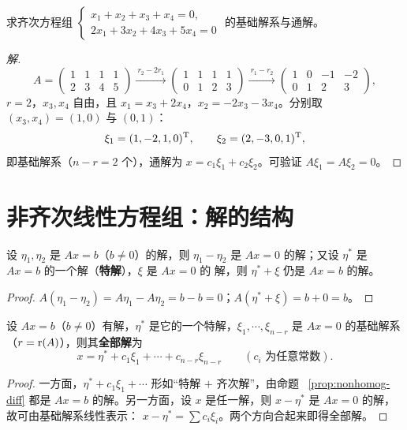 \begin{example}\label{ex:fundamental}
求齐次方程组 $\begin{cases} x_1+x_2+x_3+x_4=0, \\ 2x_1+3x_2+4x_3+5x_4=0 \end{cases}$
的基础解系与通解。
\end{example}
\begin{proof}[解]
\[
  A=\begin{pmatrix} 1 & 1 & 1 & 1 \\ 2 & 3 & 4 & 5 \end{pmatrix}
  \xrightarrow{\ r_2-2r_1\ }
  \begin{pmatrix} 1 & 1 & 1 & 1 \\ 0 & 1 & 2 & 3 \end{pmatrix}
  \xrightarrow{\ r_1-r_2\ }
  \begin{pmatrix} 1 & 0 & -1 & -2 \\ 0 & 1 & 2 & 3 \end{pmatrix},
\]
$r=2$，$x_3,x_4$ 自由，且 $x_1=x_3+2x_4$，$x_2=-2x_3-3x_4$。分别取
$(x_3,x_4)=(1,0)$ 与 $(0,1)$：
\[
  \xi_1=(1,-2,1,0)^{\mathrm{T}},\qquad \xi_2=(2,-3,0,1)^{\mathrm{T}},
\]
即基础解系（$n-r=2$ 个），通解为 $x=c_1\xi_1+c_2\xi_2$。可验证
$A\xi_1=A\xi_2=0$。
\end{proof}

\section{非齐次线性方程组：解的结构}\label{sec:nonhomogeneous}

\begin{proposition}\label{prop:nonhomog-diff}
设 $\eta_1,\eta_2$ 是 $Ax=b$（$b\neq0$）的解，则 $\eta_1-\eta_2$ 是 $Ax=0$
的解；又设 $\eta^*$ 是 $Ax=b$ 的一个解（\textbf{特解}），$\xi$ 是 $Ax=0$ 的
解，则 $\eta^*+\xi$ 仍是 $Ax=b$ 的解。
\end{proposition}
\begin{proof}
$A(\eta_1-\eta_2)=A\eta_1-A\eta_2=b-b=0$；$A(\eta^*+\xi)=b+0=b$。
\end{proof}

\begin{theorem}[解的结构定理]\label{thm:nonhomog-structure}
设 $Ax=b$（$b\neq0$）有解，$\eta^*$ 是它的一个特解，$\xi_1,\cdots,\xi_{n-r}$
是 $Ax=0$ 的基础解系（$r=\operatorname{r}(A)$），则其\textbf{全部解}为
\[
  x=\eta^*+c_1\xi_1+\cdots+c_{n-r}\xi_{n-r}\qquad(c_i\text{ 为任意常数}).
\]
\end{theorem}
\begin{proof}
一方面，$\eta^*+c_1\xi_1+\cdots$ 形如“特解 $+$ 齐次解”，由命题
~\ref{prop:nonhomog-diff} 都是 $Ax=b$ 的解。另一方面，设 $x$ 是任一解，则
$x-\eta^*$ 是 $Ax=0$ 的解，故可由基础解系线性表示：
$x-\eta^*=\sum c_i\xi_i$。两个方向合起来即得全部解。
\end{proof}

